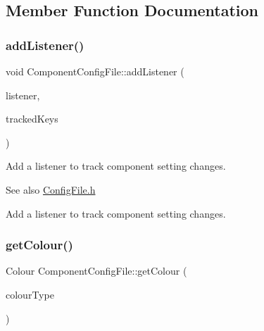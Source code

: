 \subsection{Member Function Documentation}
\mbox{\label{classComponentConfigFile_a6b4babfe3b324fb37a00d9ab9b65f5ec}} 
\subsubsection{\texorpdfstring{add\+Listener()}{addListener()}}
{\footnotesize\ttfamily void Component\+Config\+File\+::add\+Listener (\begin{DoxyParamCaption}\item[{\mbox{\hyperlink{classConfigFile_1_1Listener}{Config\+File\+::\+Listener}} $\ast$}]{listener,  }\item[{String\+Array}]{tracked\+Keys }\end{DoxyParamCaption})}

Add a listener to track component setting changes. \begin{DoxySeeAlso}{See also}
\mbox{\hyperlink{ConfigFile_8h}{Config\+File.\+h}}
\end{DoxySeeAlso}
Add a listener to track component setting changes. \mbox{\label{classComponentConfigFile_a1219b2ee65746b2dc044b2309da91544}} 
\subsubsection{\texorpdfstring{get\+Colour()}{getColour()}\hspace{0.1cm}{\footnotesize\ttfamily [1/2]}}
{\footnotesize\ttfamily Colour Component\+Config\+File\+::get\+Colour (\begin{DoxyParamCaption}\item[{\mbox{\hyperlink{classComponentConfigFile_a9bf86058d7f64d6ba94770c3dbf3cad8}{Default\+Colour}}}]{colour\+Type }\end{DoxyParamCaption})}

\mbox{\label{classComponentConfigFile_aad2b82f6ff6f0883cdf3a54d4869e8e4}} 
